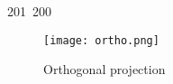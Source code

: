 201~200~\documentclass{article}
\begin{document}
\begin{enumerate}
	                                                                        	                                                                    	                                	                    	                    	                        	                        	                    	                                                                	                	            \begin{figure}[h]
	                                                                        	                                                                    	                                	                    	                    	                        	                        	                    	                                                                	                	                    \centering
	                                                                        	                                                                    	                                	                    	                    	                        	                        	                    	                                                                	                	                            \texttt{[image: ortho.png]}
	                                                                        	                                                                    	                                	                    	                    	                        	                        	                    	                                                                	                	                                    \caption{Orthogonal projection}
	                                                                        	                                                                    	                                	                    	                    	                        	                        	                    	                                                                	                	                                            \label{fig:figure-2}
	                                                                        	                                                                    	                                	                    	                    	                        	                        	                    	                                                                	                	                                                \end{figure}


\end{enumerate}
\end{document}
